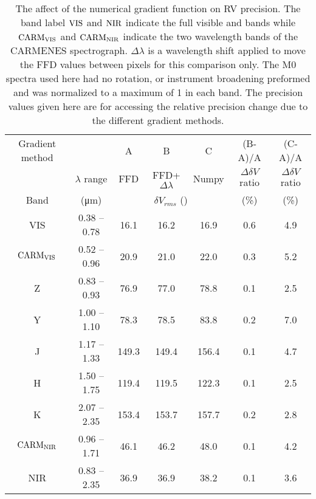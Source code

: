 
\begin{table}
    \centering
    \caption{The affect of the numerical gradient function on RV precision. The band label \(\rm VIS\) and \(\rm NIR\) indicate the full visible and \nir{} bands while  \(\rm CARM_{VIS}\)  and \(\rm CARM_{NIR}\)  indicate the two wavelength bands of the CARMENES spectrograph. \(\Delta\lambda\) is a wavelength shift applied to move the FFD values between pixels for this comparison only. The M0 spectra used here had no rotation, or instrument broadening preformed and  was normalized to a maximum of 1 in each band. The precision values given here are for accessing the relative precision change due to the different gradient methods.}
    \begin{tabular}{ccccccc}
        \toprule
        Gradient method &  &  A &   B & C & (B-A)/A & (C-A)/A \\
        &   \(\lambda\) range & FFD & FFD+\(\Delta\lambda\) &  Numpy & \(\Delta\delta V\) ratio& \(\Delta\delta V\) ratio\\

        Band  & (\si{\micro\meter}) &\multicolumn{3}{c}{\(\delta V_{rms}\) (\mps{})}  & (\%) & (\%) \\
        \midrule
        VIS & 0.38 -- 0.78 & 16.1 & 16.2 & 16.9  & 0.6 & 4.9\\
        \(\rm CARM_{VIS}\) & 0.52 --  0.96 & 20.9 & 21.0 & 22.0 & 0.3& 5.2 \\
        Z & 0.83 -- 0.93 & 76.9 & 77.0 & 78.8  & 0.1 & 2.5\\
        Y & 1.00 -- 1.10 & 78.3 & 78.5 & 83.8 & 0.2 & 7.0 \\
        J & 1.17 -- 1.33 & 149.3 & 149.4 & 156.4 & 0.1 & 4.7 \\
        H & 1.50 -- 1.75 & 119.4 & 119.5 & 122.3 & 0.1 & 2.5 \\
        K & 2.07 -- 2.35 & 153.4 & 153.7 & 157.7  & 0.2 & 2.8\\
        \(\rm CARM_{NIR}\) & 0.96 -- 1.71 & 46.1 & 46.2 & 48.0 & 0.1& 4.2 \\
        NIR & 0.83 -- 2.35 & 36.9 & 36.9 & 38.2 & 0.1 & 3.6  \\
        \bottomrule
    \end{tabular}\label{tab:numerical_gradients}
\end{table}
